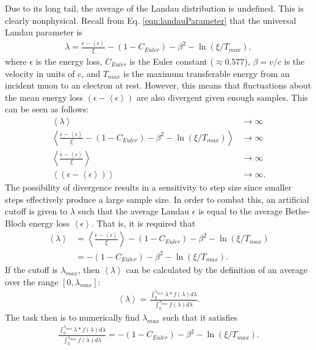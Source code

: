 Due to its long tail, the average of the Landau distribution is undefined. This is clearly nonphysical. Recall from Eq. \eqref{eqn:landauParameter} that the universal Landau parameter is
\begin{align*}
\lambda=\frac{\epsilon-\left<\epsilon\right>}{\xi}-(1-C_{Euler})-\beta ^2 -\ln (\xi/T_{max}),
\end{align*}
where $\epsilon$ is the energy loss, $C_{Euler}$ is the Euler constant ($\approx 0.577$), $\beta=v/c$ is the velocity in units of $c$, and $T_{max}$ is the maximum transferable energy from an incident muon to an electron at rest. However, this means that fluctuations about the mean energy loss $\left(\epsilon-\left<\epsilon\right>\right)$ are also divergent given enough samples. This can be seen as follows:
\begin{align*}
\left<\lambda\right>&\rightarrow\infty\\
\left<\frac{\epsilon-\left<\epsilon\right>}{\xi}-(1-C_{Euler})-\beta ^2 -\ln (\xi/T_{max})\right>&\rightarrow\infty\\
\left<\frac{\epsilon-\left<\epsilon\right>}{\xi}\right>&\rightarrow\infty\\
\left<\left(\epsilon-\left<\epsilon\right>\right)\right>&\rightarrow\infty.
\end{align*}
The possibility of divergence results in a sensitivity to step size since smaller steps effectively produce a large sample size. In order to combat this, an artificial cutoff is given to $\lambda$ such that the average Landau $\epsilon$ is equal to the average Bethe-Bloch energy loss $\left<\epsilon\right>$. That is, it is required that
\begin{align*}
\left<\lambda\right>&=\left<\frac{\epsilon-\left<\epsilon\right>}{\xi}\right>-(1-C_{Euler})-\beta^2-\ln(\xi/T_{max})\\
&=-(1-C_{Euler})-\beta^2-\ln(\xi/T_{max}).
\end{align*}
If the cutoff is $\lambda_{max}$, then $\left<\lambda\right>$ can be calculated by the definition of an average over the range $[0,\lambda_{max}]$:
\begin{align*}
\left<\lambda\right>=\frac{\int_0 ^{\lambda_{max}} \lambda * f(\lambda) d\lambda}{\int_0 ^{\lambda_{max}}f(\lambda) d\lambda}.
\end{align*}
The task then is to numerically find $\lambda_{max}$ such that it satisfies
\begin{align*}
\frac{\int_0 ^{\lambda_{max}} \lambda * f(\lambda) d\lambda}{\int_0 ^{\lambda_{max}}f(\lambda) d\lambda}=-(1-C_{Euler})-\beta^2-\ln(\xi/T_{max}).
\end{align*}
